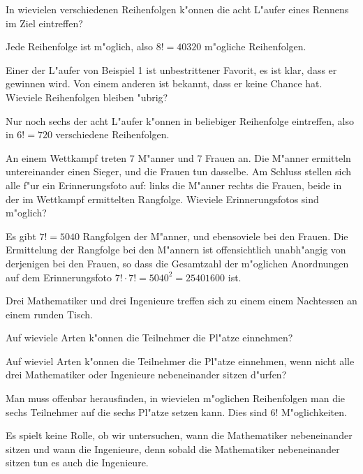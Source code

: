 \begin{beispiele}
\item In wievielen verschiedenen Reihenfolgen k"onnen die acht L"aufer
eines Rennens im Ziel eintreffen?

\begin{loesung}
Jede Reihenfolge ist m"oglich, also $8!=40320$ m"ogliche Reihenfolgen.
\end{loesung}

\item Einer der L"aufer von Beispiel 1 ist unbestrittener Favorit,
es ist klar, dass er gewinnen wird. Von einem anderen ist bekannt,
dass er keine Chance hat. Wieviele Reihenfolgen bleiben "ubrig?

\begin{loesung}
Nur noch sechs der acht L"aufer k"onnen in beliebiger Reihenfolge
eintreffen, also in $6!=720$ verschiedene Reihenfolgen.
\end{loesung}

\item An einem Wettkampf treten 7 M"anner und 7 Frauen an. Die M"anner
ermitteln untereinander einen Sieger, und die Frauen tun dasselbe.
Am Schluss stellen sich alle f"ur ein Erinnerungsfoto auf: links
die M"anner rechts die Frauen, beide in der im Wettkampf ermittelten
Rangfolge. Wieviele Erinnerungsfotos sind m"oglich?

\begin{loesung}
Es gibt $7!=5040$ Rangfolgen der M"anner, und ebensoviele bei den
Frauen. Die Ermittelung der Rangfolge bei den M"annern ist offensichtlich
unabh"angig von derjenigen bei den Frauen, so dass die Gesamtzahl der
m"oglichen Anordnungen auf dem Erinnerungsfoto $7!\cdot 7!=5040^2=25401600$
ist.
\end{loesung}

\item
\label{nachtessen}
Drei Mathematiker und drei Ingenieure treffen sich zu einem
einem Nachtessen an einem runden Tisch.
\begin{teilaufgaben}
\item
Auf wieviele Arten k"onnen die Teilnehmer die Pl"atze einnehmen?
\item
Auf wieviel Arten k"onnen 
die Teilnehmer die Pl"atze einnehmen, wenn nicht alle drei Mathematiker
oder Ingenieure nebeneinander sitzen d"urfen?
\end{teilaufgaben}

\begin{loesung}
\begin{teilaufgaben}
\item
Man muss offenbar herausfinden, in wievielen m"oglichen Reihenfolgen
man die sechs Teilnehmer auf die sechs Pl"atze setzen kann. Dies
sind $6!$ M"oglichkeiten.
\item
Es spielt keine Rolle, ob wir untersuchen, wann die Mathematiker 
nebeneinander sitzen und wann die Ingenieure, denn sobald die Mathematiker
nebeneinander sitzen tun es auch die Ingenieure.


\end{teilaufgaben}
\end{loesung}
\end{beispiele}

